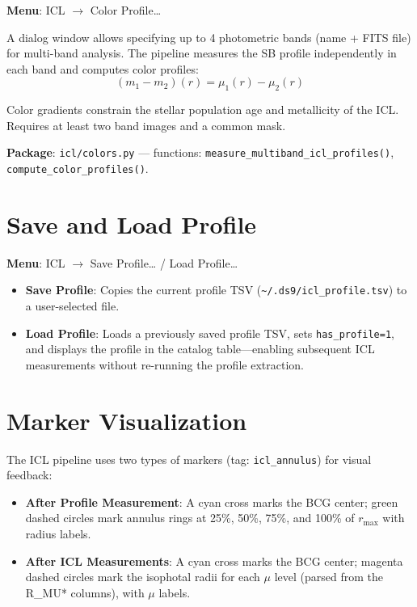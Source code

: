 \documentclass[11pt,fleqn]{book}
\begin{document}
\textbf{Menu}: ICL $\to$ Color Profile\ldots

A dialog window allows specifying up to 4 photometric bands (name + FITS file) for multi-band analysis.  The pipeline measures the SB profile independently in each band and computes color profiles:
\begin{equation}
  (m_1 - m_2)(r) = \mu_1(r) - \mu_2(r)
\end{equation}

Color gradients constrain the stellar population age and metallicity of the ICL.  Requires at least two band images and a common mask.

\textbf{Package}: \texttt{icl/colors.py} --- functions: \texttt{measure\_multiband\_icl\_profiles()}, \texttt{compute\_color\_profiles()}.


\section{Save and Load Profile}

\textbf{Menu}: ICL $\to$ Save Profile\ldots{} / Load Profile\ldots

\begin{itemize}[leftmargin=2em]
  \item \textbf{Save Profile}: Copies the current profile TSV (\texttt{\textasciitilde/.ds9/icl\_profile.tsv}) to a user-selected file.
  \item \textbf{Load Profile}: Loads a previously saved profile TSV, sets \texttt{has\_profile=1}, and displays the profile in the catalog table---enabling subsequent ICL measurements without re-running the profile extraction.
\end{itemize}


\section{Marker Visualization}

The ICL pipeline uses two types of markers (tag: \texttt{icl\_annulus}) for visual feedback:

\begin{itemize}[leftmargin=2em]
  \item \textbf{After Profile Measurement}: A cyan cross marks the BCG center; green dashed circles mark annulus rings at 25\%, 50\%, 75\%, and 100\% of $r_\mathrm{max}$ with radius labels.
  \item \textbf{After ICL Measurements}: A cyan cross marks the BCG center; magenta dashed circles mark the isophotal radii for each $\mu$ level (parsed from the R\_MU* columns), with $\mu$ labels.
\end{itemize}
\end{document}
